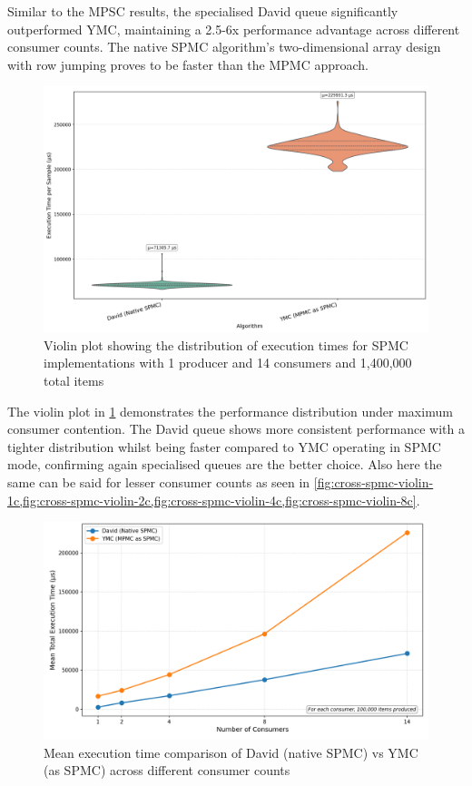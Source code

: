 Similar to the \ac{MPSC} results, the specialised David queue significantly outperformed \ac{YMC}, maintaining a 2.5-6x performance advantage across different consumer counts. The native \ac{SPMC} algorithm's two-dimensional array design with row jumping proves to be faster than the \ac{MPMC} approach.

\begin{figure}[htb]
\centering
\caption{Violin plot showing the distribution of execution times for \ac{SPMC} implementations with 1 producer and 14 consumers and 1,400,000 total items}
\label{fig:spmc-violin-14c}
\includegraphics[width=\textwidth]{images/results/best_in_spmc_performance_violin_1P14C.png}
\end{figure}

The violin plot in \cref{fig:spmc-violin-14c} demonstrates the performance distribution under maximum consumer contention. The David queue shows more consistent performance with a tighter distribution whilst being faster compared to \ac{YMC} operating in SPMC mode, confirming again specialised queues are the better choice. Also here the same can be said for lesser consumer counts as seen in \cref{fig:cross-spmc-violin-1c,fig:cross-spmc-violin-2c,fig:cross-spmc-violin-4c,fig:cross-spmc-violin-8c}.

\begin{figure}[htb]
\centering
\caption{Mean execution time comparison of David (native SPMC) vs YMC (as SPMC) across different consumer counts}
\label{fig:cross-spmc-mean}
\includegraphics[width=\textwidth]{images/results/best_in_spmc_mean_performance_vs_consumers.png}
\end{figure}
